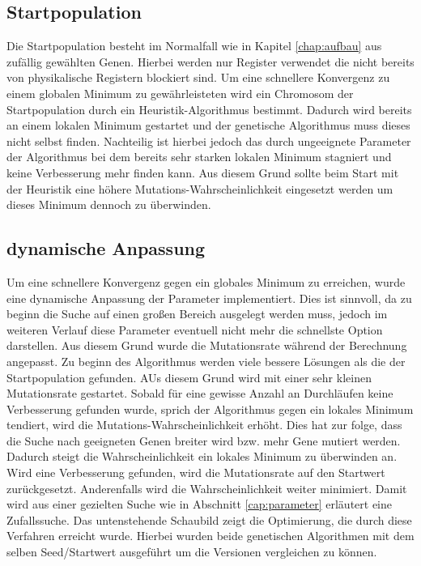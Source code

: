 \subsection{Startpopulation}
\label{sub:startpop}
Die Startpopulation besteht im Normalfall wie in Kapitel \ref{chap:aufbau} aus zufällig gewählten Genen. Hierbei werden nur Register verwendet die nicht bereits von physikalische Registern blockiert sind.
Um eine schnellere Konvergenz zu einem globalen Minimum zu gewährleisteten wird ein Chromosom der Startpopulation durch ein Heuristik-Algorithmus bestimmt. Dadurch wird bereits an einem lokalen Minimum gestartet und der genetische Algorithmus muss dieses nicht selbst finden. 
Nachteilig ist hierbei jedoch das durch ungeeignete Parameter der Algorithmus bei dem bereits sehr starken lokalen Minimum stagniert und keine Verbesserung mehr finden kann. Aus diesem Grund sollte beim Start mit der Heuristik eine höhere Mutations-Wahrscheinlichkeit eingesetzt werden um dieses Minimum dennoch zu überwinden.

\subsection{dynamische Anpassung}
Um eine schnellere Konvergenz gegen ein globales Minimum zu erreichen, wurde eine dynamische Anpassung der Parameter implementiert. Dies ist sinnvoll, da zu beginn die Suche auf einen großen Bereich ausgelegt werden muss, jedoch im weiteren Verlauf diese Parameter eventuell nicht mehr die schnellste Option darstellen. Aus diesem Grund wurde die Mutationsrate während der Berechnung angepasst. Zu beginn des Algorithmus werden viele bessere Lösungen als die der Startpopulation gefunden. AUs diesem Grund wird mit einer sehr kleinen Mutationsrate gestartet. Sobald für eine gewisse Anzahl an Durchläufen keine Verbesserung gefunden wurde, sprich der Algorithmus gegen ein lokales Minimum tendiert, wird die Mutations-Wahrscheinlichkeit erhöht. Dies hat zur folge, dass die Suche nach geeigneten Genen breiter wird bzw. mehr Gene mutiert werden. Dadurch steigt die Wahrscheinlichkeit ein lokales Minimum zu überwinden an. Wird eine Verbesserung gefunden, wird die Mutationsrate auf den Startwert zurückgesetzt. Anderenfalls wird die Wahrscheinlichkeit weiter minimiert. Damit wird aus einer gezielten Suche wie in Abschnitt \ref{cap:parameter} erläutert eine Zufallssuche.
Das untenstehende Schaubild zeigt die Optimierung, die durch diese Verfahren erreicht wurde. Hierbei wurden beide genetischen Algorithmen mit dem selben Seed/Startwert ausgeführt um die Versionen vergleichen zu können.

